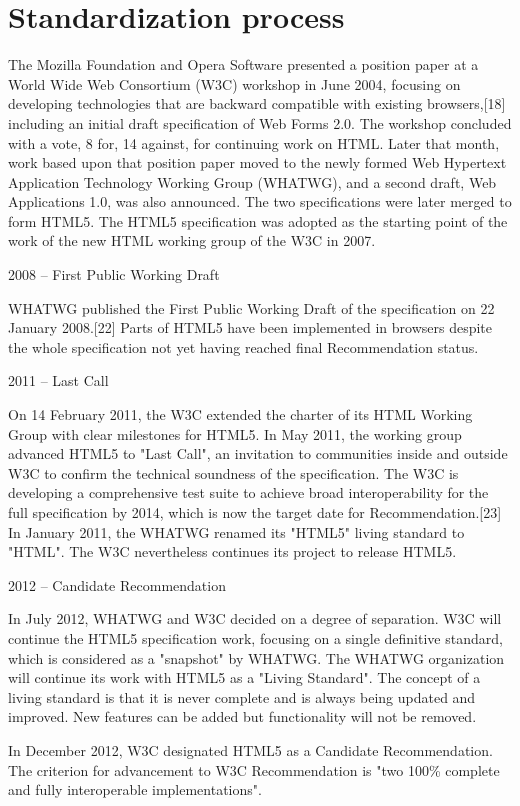 \section{Standardization process}

The Mozilla Foundation and Opera Software presented a position paper at a World Wide Web Consortium (W3C) workshop in June 2004, focusing on developing technologies that are backward compatible with existing browsers,[18] including an initial draft specification of Web Forms 2.0. The workshop concluded with a vote, 8 for, 14 against, for continuing work on HTML. Later that month, work based upon that position paper moved to the newly formed Web Hypertext Application Technology Working Group (WHATWG), and a second draft, Web Applications 1.0, was also announced. The two specifications were later merged to form HTML5. The HTML5 specification was adopted as the starting point of the work of the new HTML working group of the W3C in 2007.

\begin{compactitem}
\item 2008 – First Public Working Draft

WHATWG published the First Public Working Draft of the specification on 22 January 2008.[22] Parts of HTML5 have been implemented in browsers despite the whole specification not yet having reached final Recommendation status.

\item 2011 – Last Call

On 14 February 2011, the W3C extended the charter of its HTML Working Group with clear milestones for HTML5. In May 2011, the working group advanced HTML5 to "Last Call", an invitation to communities inside and outside W3C to confirm the technical soundness of the specification. The W3C is developing a comprehensive test suite to achieve broad interoperability for the full specification by 2014, which is now the target date for Recommendation.[23] In January 2011, the WHATWG renamed its "HTML5" living standard to "HTML". The W3C nevertheless continues its project to release HTML5.

\item 2012 – Candidate Recommendation

In July 2012, WHATWG and W3C decided on a degree of separation. W3C will continue the HTML5 specification work, focusing on a single definitive standard, which is considered as a "snapshot" by WHATWG. The WHATWG organization will continue its work with HTML5 as a "Living Standard". The concept of a living standard is that it is never complete and is always being updated and improved. New features can be added but functionality will not be removed.

In December 2012, W3C designated HTML5 as a Candidate Recommendation. The criterion for advancement to W3C Recommendation is "two 100\% complete and fully interoperable implementations".

\end{compactitem}





